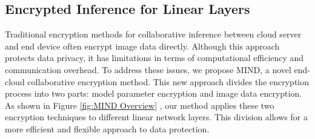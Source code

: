 \documentclass[conference]{IEEEtran}
\begin{document}



\subsection{Encrypted Inference for Linear Layers }
Traditional encryption methods for collaborative inference between cloud server and end device often encrypt image data directly. Although this approach protects data privacy, it has limitations in terms of computational efficiency and communication overhead. To address these issues, we propose MIND, a novel end-cloud collaborative encryption method. This new approach divides the encryption process into two parts: model parameter encryption and image data encryption. As shown in Figure \ref{fig:MIND Overview} , our method applies these two encryption techniques to different linear network layers. This division allows for a more efficient and flexible approach to data protection.
\end{document}
